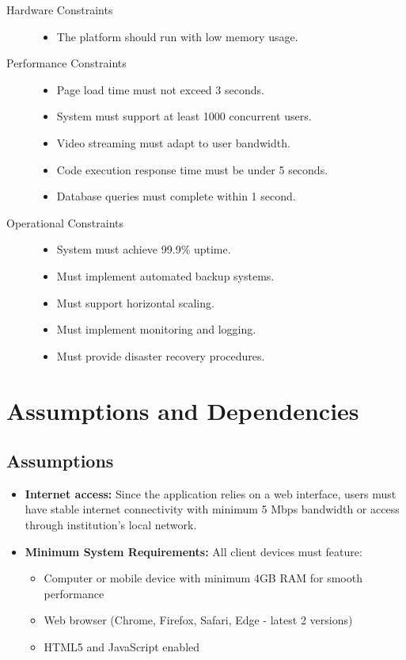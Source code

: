 \documentclass[a4paper, 11pt]{scrreprt}
\begin{document}
\begin{description}
    \item[Hardware Constraints]\mbox{}
        \begin{itemize}
            \item The platform should run with low memory usage.
        \end{itemize}
    \item[Performance Constraints]\mbox{}
        \begin{itemize}
            \item Page load time must not exceed 3 seconds.
            \item System must support at least 1000 concurrent users.
            \item Video streaming must adapt to user bandwidth.
            \item Code execution response time must be under 5 seconds.
            \item Database queries must complete within 1 second.
        \end{itemize}
    \item[Operational Constraints]\mbox{}
        \begin{itemize}
            \item System must achieve 99.9\% uptime.
            \item Must implement automated backup systems.
            \item Must support horizontal scaling.
            \item Must implement monitoring and logging.
            \item Must provide disaster recovery procedures.
        \end{itemize}
\end{description}

\section{Assumptions and Dependencies}

\subsection{Assumptions}
\begin{itemize}
    \item \textbf{Internet access:} Since the application relies on a web interface, users must have stable internet connectivity with minimum 5 Mbps bandwidth or access through institution's local network.
    \item \textbf{Minimum System Requirements:} All client devices must feature:
        \begin{itemize}
            \item Computer or mobile device with minimum 4GB RAM for smooth performance
            \item Web browser (Chrome, Firefox, Safari, Edge - latest 2 versions)
            \item HTML5 and JavaScript enabled
        \end{itemize}
\end{itemize}
\end{document}
